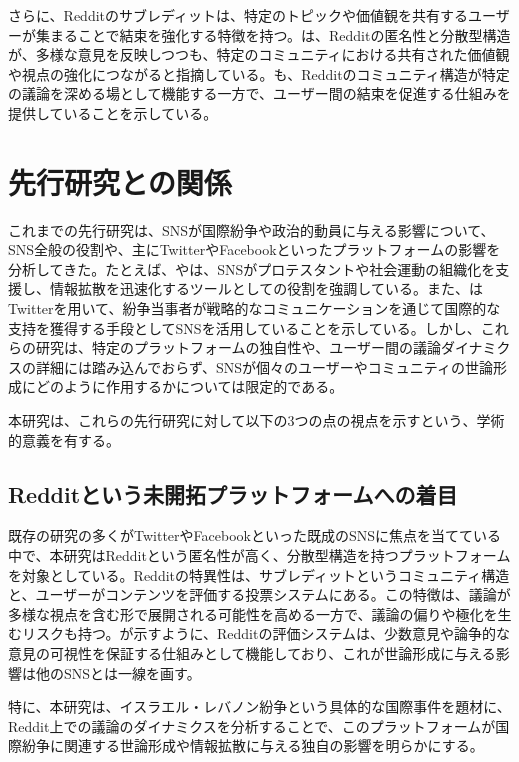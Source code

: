\documentclass[11pt, a4j]{jreport}
\begin{document}
    さらに、Redditのサブレディットは、特定のトピックや価値観を共有するユーザーが集まることで結束を強化する特徴を持つ。\citet{massanari2015participatory}は、Redditの匿名性と分散型構造が、多様な意見を反映しつつも、特定のコミュニティにおける共有された価値観や視点の強化につながると指摘している。\citet{gaffney2018caveat}も、Redditのコミュニティ構造が特定の議論を深める場として機能する一方で、ユーザー間の結束を促進する仕組みを提供していることを示している。

    \section{先行研究との関係}
    これまでの先行研究は、SNSが国際紛争や政治的動員に与える影響について、SNS全般の役割や、主にTwitterやFacebookといったプラットフォームの影響を分析してきた。たとえば、\citet{shrinky2011}や\citet{howard-hussain2013}は、SNSがプロテスタントや社会運動の組織化を支援し、情報拡散を迅速化するツールとしての役割を強調している。また、\citet{zeitzoff2017}はTwitterを用いて、紛争当事者が戦略的なコミュニケーションを通じて国際的な支持を獲得する手段としてSNSを活用していることを示している。しかし、これらの研究は、特定のプラットフォームの独自性や、ユーザー間の議論ダイナミクスの詳細には踏み込んでおらず、SNSが個々のユーザーやコミュニティの世論形成にどのように作用するかについては限定的である。

    本研究は、これらの先行研究に対して以下の3つの点の視点を示すという、学術的意義を有する。

    \subsection{Redditという未開拓プラットフォームへの着目}
    既存の研究の多くがTwitterやFacebookといった既成のSNSに焦点を当てている中で、本研究はRedditという匿名性が高く、分散型構造を持つプラットフォームを対象としている。Redditの特異性は、サブレディットというコミュニティ構造と、ユーザーがコンテンツを評価する投票システムにある。この特徴は、議論が多様な視点を含む形で展開される可能性を高める一方で、議論の偏りや極化を生むリスクも持つ。\citet{massanari2015participatory}が示すように、Redditの評価システムは、少数意見や論争的な意見の可視性を保証する仕組みとして機能しており、これが世論形成に与える影響は他のSNSとは一線を画す。

    特に、本研究は、イスラエル・レバノン紛争という具体的な国際事件を題材に、Reddit上での議論のダイナミクスを分析することで、このプラットフォームが国際紛争に関連する世論形成や情報拡散に与える独自の影響を明らかにする。
\end{document}
